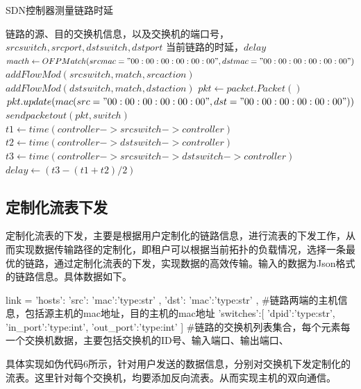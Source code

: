 \begin{algorithm}[!htb]
    \caption{SDN控制器测量链路时延}
    \begin{algorithmic}[1] %
        \Require 链路的源、目的交换机信息，以及交换机的端口号，$srcswitch,srcport,dstswitch,dstport$
        \Ensure 当前链路的时延，$delay$
        	\State $macth \gets OFPMatch(srcmac="00:00:00:00:00:00",dstmac="00:00:00:00:00:00")$
        	\State $addFlowMod(srcswitch,match,srcaction)$
        	\State $addFlowMod(dstswitch,match,dstaction)$
        \EndFunction
        	\State $pkt \gets packet.Packet()$
        	\State $pkt.update(mac(src="00:00:00:00:00:00",dst="00:00:00:00:00:00"))$
        	\State $sendpacketout(pkt, switch)$
        \EndFunction
         	\State $t1 \gets time(controller->srcswitch->controller)$
         	\State $t2 \gets time(controller->dstswitch->controller)$
         	\State $t3 \gets time(controller->srcswitch->dstswitch->controller)$
         	\State $delay \gets (t3-(t1+t2)/2)$
         	\State {}
        \EndFunction
    \end{algorithmic}
\end{algorithm}

\subsection{定制化流表下发}
定制化流表的下发，主要是根据用户定制化的链路信息，进行流表的下发工作，从而实现数据传输路径的定制化，即租户可以根据当前拓扑的负载情况，选择一条最优的链路，通过定制化流表的下发，实现数据的高效传输。输入的数据为Json格式的链路信息。具体数据如下。

\begin{python} 
link = {
	'hosts':{
		'src':{
			'mac':'type:str'
		},
		'dst':{
			'mac':'type:str'
		}
	}, #链路两端的主机信息，包括源主机的mac地址，目的主机的mac地址
	'switches':[
		{
			'dpid':'type:str',
			'in_port':'type:int',
			'out_port':'type:int'
		}
	] #链路的交换机列表集合，每个元素每一个交换机数据，主要包括交换机的ID号、输入端口、输出端口、
}
\end{python}

具体实现如伪代码6所示，针对用户发送的数据信息，分别对交换机下发定制化的流表。这里针对每个交换机，均要添加反向流表。从而实现主机的双向通信。

